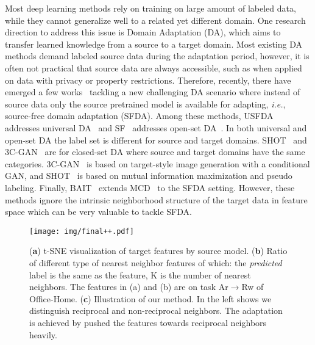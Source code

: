 \documentclass{article}
\begin{document}
Most deep learning methods rely on training on large amount of labeled data, while they cannot generalize well to a related yet different domain. One research direction to address this issue is Domain Adaptation (DA), which aims to transfer learned knowledge from a source to a target domain. Most existing DA methods demand labeled source data during the adaptation period, however, it is often not practical that source data are always accessible, such as when applied on data with privacy or property restrictions. Therefore, recently, there have emerged a few works~\cite{kundu2020universal,kundu2020towards,li2020model,liang2020we} tackling a new challenging DA scenario where instead of source data only the source pretrained model is available for adapting, \textit{i.e.}, source-free domain adaptation (SFDA). Among these methods, USFDA~\cite{kundu2020universal} addresses universal DA~\cite{you2019universal} and SF~\cite{kundu2020towards} addresses open-set DA~\cite{saito2018open}. In both universal and open-set DA the label set is different for source and target domains. SHOT~\cite{liang2020we} and 3C-GAN~\cite{li2020model} are for closed-set DA where source and target domains have the same categories. 3C-GAN~\cite{li2020model} is based on target-style image generation with a conditional GAN, and SHOT~\cite{liang2020we} is based on mutual information maximization and pseudo labeling. {Finally, BAIT~\cite{yang2020unsupervised} extends MCD~\cite{saito2018maximum} to the SFDA setting.}
However, these methods ignore the intrinsic neighborhood structure of the target data in feature space which can be very valuable to tackle SFDA. 




\begin{figure}[tbp]
\centering
	\texttt{[image: img/final++.pdf]}
\caption{(\textbf{a}) t-SNE visualization of target features by source model. (\textbf{b}) Ratio of different type of nearest neighbor features of which: the \textit{predicted} label is the same as the feature, K is the number of nearest neighbors. The features in (a) and (b) are on task Ar$\rightarrow$Rw of Office-Home.   (\textbf{c}) Illustration of our method. In the left shows we distinguish reciprocal and non-reciprocal neighbors. The adaptation is achieved by pushed the features towards reciprocal neighbors heavily. 
\vspace{-2mm}}
	\label{fig:motivation}
	\vspace{-2mm}
\end{figure}
\end{document}

